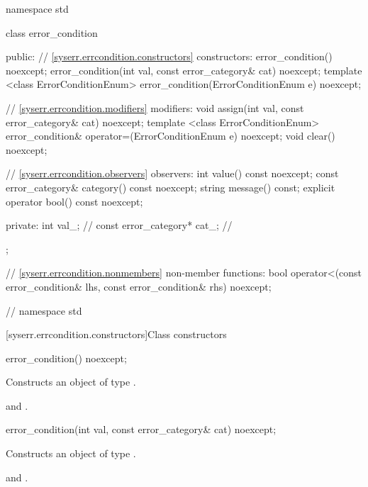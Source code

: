 %
\begin{codeblock}
namespace std {
  class error_condition {
  public:
    // \ref{syserr.errcondition.constructors} constructors:
    error_condition() noexcept;
    error_condition(int val, const error_category& cat) noexcept;
    template <class ErrorConditionEnum>
      error_condition(ErrorConditionEnum e) noexcept;

    // \ref{syserr.errcondition.modifiers} modifiers:
    void assign(int val, const error_category& cat) noexcept;
    template <class ErrorConditionEnum>
        error_condition& operator=(ErrorConditionEnum e) noexcept;
    void clear() noexcept;

    // \ref{syserr.errcondition.observers} observers:
    int value() const noexcept;
    const error_category& category() const noexcept;
    string message() const;
    explicit operator bool() const noexcept;

  private:
    int val_;                   // \expos
    const error_category* cat_; // \expos
  };

  // \ref{syserr.errcondition.nonmembers} non-member functions:
  bool operator<(const error_condition& lhs, const error_condition& rhs) noexcept;
} // namespace std
\end{codeblock}

[syserr.errcondition.constructors]{Class  constructors}

%
\begin{itemdecl}
error_condition() noexcept;
\end{itemdecl}

\begin{itemdescr}
\pnum
\effects Constructs an object of type .

\pnum
\postconditions {} and .
\end{itemdescr}

%
\begin{itemdecl}
error_condition(int val, const error_category& cat) noexcept;
\end{itemdecl}

\begin{itemdescr}
\pnum
\effects Constructs an object of type .

\pnum
\postconditions {} and .
\end{itemdescr}

